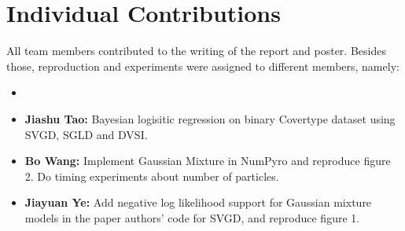 \section{Individual Contributions}
All team members contributed to the writing of the report and poster. Besides those, reproduction and experiments were assigned to different members, namely:
\begin{itemize}
    \item 
    \item \textbf{Jiashu Tao:} Bayesian logisitic regression on binary Covertype dataset using SVGD, SGLD and DVSI.
    \item \textbf{Bo Wang:} Implement Gaussian Mixture in NumPyro and reproduce figure 2. Do timing experiments about number of particles.
    \item \textbf{Jiayuan Ye:} Add negative log likelihood support for Gaussian mixture models in the paper authors' code for SVGD, and reproduce figure 1. 
\end{itemize}